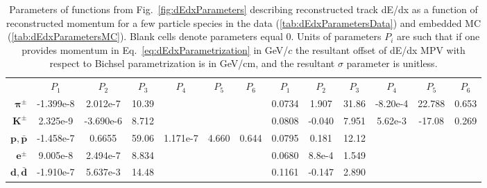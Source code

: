 \begin{table}[hb!]
{\begin{tabular}{r||c|c|c|c|c|c||c|c|c|c|c|c}
  & $P_{1}$ & $P_{2}$ & $P_{3}$ & $P_{4}$ & $P_{5}$ & $P_{6}$ & $P_{1}$ & $P_{2}$ & $P_{3}$ & $P_{4}$ & $P_{5}$ & $P_{6}$ \\ \Xhline{2\arrayrulewidth}
 $\bm{\pi^{\pm}}$ & \scriptsize -1.399e-8 & \scriptsize 2.012e-7 & \scriptsize10.39 & \scriptsize&             \scriptsize&                \scriptsize&         \scriptsize 0.0734 & \scriptsize1.907 & \scriptsize31.86 & \scriptsize-8.20e-4 & \scriptsize 22.788 & \scriptsize 0.653\\ \hline
 $\bm{K^{\pm}}$ & \scriptsize    2.325e-9 & \scriptsize -3.690e-6 & \scriptsize 8.712 & \scriptsize&           \scriptsize&               \scriptsize&          \scriptsize 0.0808 &  \scriptsize -0.040 & \scriptsize7.951 & \scriptsize 5.62e-3 & \scriptsize -17.08 &  \scriptsize 0.269\\ \hline
 $\bm{p,\bar{p}}$ & \scriptsize -1.458e-7 & \scriptsize 0.6655 &   \scriptsize59.06 & \scriptsize 1.171e-7 &    \scriptsize 4.660 &       \scriptsize 0.644 &   \scriptsize0.0795 & \scriptsize 0.181 & \scriptsize12.12 & \scriptsize& \scriptsize& \scriptsize\\ \hline
 $\bm{e^{\pm}}$ & \scriptsize   9.005e-8 &  \scriptsize 2.494e-7 & \scriptsize 8.834 & \scriptsize&              \scriptsize&              \scriptsize&          \scriptsize 0.0680 & \scriptsize 8.8e-4 & \scriptsize 1.549 & \scriptsize& \scriptsize& \scriptsize\\ \hline
 $\bm{d,\bar{d}}$ & \scriptsize -1.910e-7 & \scriptsize 5.637e-3 &  \scriptsize 14.48 & \scriptsize&               \scriptsize&              \scriptsize&          \scriptsize 0.1161 & \scriptsize -0.147 & \scriptsize 2.890 & \scriptsize& \scriptsize& \scriptsize%
\end{tabular}%
}\vspace{-7pt}\caption[Parameters of functions from Fig.~\ref{fig:dEdxParameters} describing reconstructed track dE/dx as a function of reconstructed momentum for a few particle species.]{Parameters of functions from Fig.~\ref{fig:dEdxParameters} describing reconstructed track dE/dx as a function of reconstructed momentum for a few particle species in the data (\ref{tab:dEdxParametersData}) and embedded MC (\ref{tab:dEdxParametersMC}). Blank cells denote parameters equal 0. Units of parameters $P_{i}$ are such that if one provides momentum in Eq.~\eqref{eq:dEdxParametrization} in GeV/$c$ the resultant offset of dE/dx MPV with respect to Bichsel parametrization is in GeV/cm, and the resultant $\sigma$ parameter is unitless.}\label{tab:dEdxParameters}
\end{table}%
